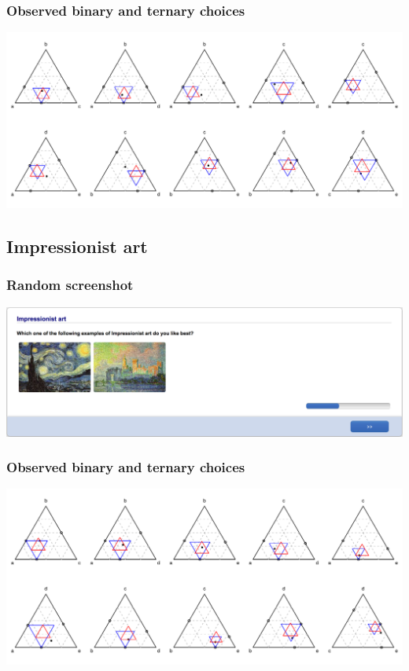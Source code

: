\documentclass[11pt,letter]{article}
\begin{document}
\subsubsection*{Observed binary and ternary choices}

\includegraphics[width=15cm]{./Population_study_data/Simplexes/aboriginal_art.pdf}

\pagebreak

\subsection*{Impressionist art}



\subsubsection*{Random screenshot}

\includegraphics[width=15cm]{Population_study_design/screenshot_impressionist_art.png}

\subsubsection*{Observed binary and ternary choices}

\includegraphics[width=15cm]{./Population_study_data/Simplexes/impressionist_art.pdf}
\end{document}
